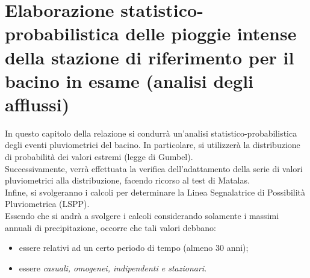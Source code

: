 \section{Elaborazione statistico-probabilistica delle pioggie intense della stazione di riferimento per il bacino in esame (analisi degli afflussi)}
In questo capitolo della relazione si condurrà un'analisi statistico-probabilistica degli eventi pluviometrici del bacino. In particolare, si utilizzerà la distribuzione di probabilità dei valori estremi (legge di Gumbel).\\
Successivamente, verrà effettuata la verifica dell'adattamento della serie di valori pluviometrici alla distribuzione, facendo ricorso al test di Matalas.\\
Infine, si svolgeranno i calcoli per determinare la Linea Segnalatrice di Possibilità Pluviometrica (LSPP).\\
Essendo che si andrà a svolgere i calcoli considerando solamente i massimi annuali di precipitazione, occorre che tali valori debbano: 
\begin{itemize}
    \item essere relativi ad un certo periodo di tempo (almeno 30 anni);
    \item essere \textit{casuali, omogenei, indipendenti e stazionari}.
\end{itemize} 


